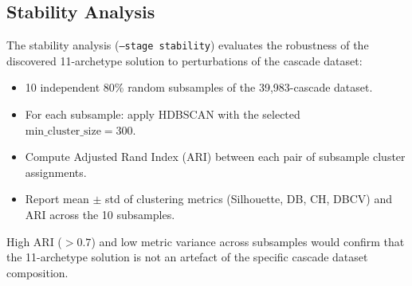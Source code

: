 \documentclass[12pt, a4paper]{article}
\begin{document}
\subsection{Stability Analysis}

The stability analysis (\texttt{--stage stability}) evaluates the robustness of the discovered 11-archetype solution to perturbations of the cascade dataset:

\begin{itemize}
  \item 10 independent 80\% random subsamples of the 39,983-cascade dataset.
  \item For each subsample: apply HDBSCAN with the selected $\text{min\_cluster\_size} = 300$.
  \item Compute Adjusted Rand Index (ARI) between each pair of subsample cluster assignments.
  \item Report mean $\pm$ std of clustering metrics (Silhouette, DB, CH, DBCV) and ARI across the 10 subsamples.
\end{itemize}

High ARI ($> 0.7$) and low metric variance across subsamples would confirm that the 11-archetype solution is not an artefact of the specific cascade dataset composition.


\end{document}
